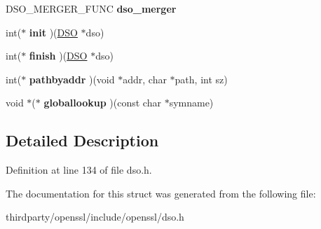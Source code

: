 \begin{DoxyCompactItemize}
\mbox{\label{structdso__meth__st_a69ab12d20b8622ad9ac892e9feb29a10}} 
D\+S\+O\+\_\+\+M\+E\+R\+G\+E\+R\+\_\+\+F\+U\+NC {\bfseries dso\+\_\+merger}
\item 
\mbox{\label{structdso__meth__st_af88ab1073bac7849a6b23a0cb7df4872}} 
int($\ast$ {\bfseries init} )(\hyperlink{structdso__st}{D\+SO} $\ast$dso)
\item 
\mbox{\label{structdso__meth__st_a936ec4fc5bf24889189556a37a3c83b7}} 
int($\ast$ {\bfseries finish} )(\hyperlink{structdso__st}{D\+SO} $\ast$dso)
\item 
\mbox{\label{structdso__meth__st_ae05dbf002bd9bf1d78d1ca833f225e4b}} 
int($\ast$ {\bfseries pathbyaddr} )(void $\ast$addr, char $\ast$path, int sz)
\item 
\mbox{\label{structdso__meth__st_a3aa2a99cee5689fdd4800498f4d791b6}} 
void $\ast$($\ast$ {\bfseries globallookup} )(const char $\ast$symname)
\end{DoxyCompactItemize}


\subsection{Detailed Description}


Definition at line 134 of file dso.\+h.



The documentation for this struct was generated from the following file\+:\begin{DoxyCompactItemize}
\item 
thirdparty/openssl/include/openssl/dso.\+h\end{DoxyCompactItemize}
